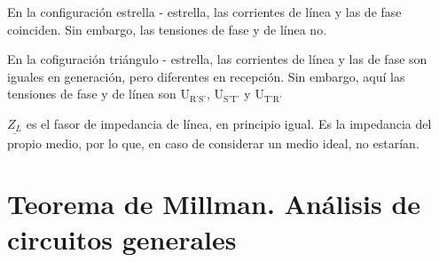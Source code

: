 \documentclass{article}
\begin{document}
\begin{flushleft}
En la configuración estrella - estrella, las corrientes de línea y las de fase coinciden. Sin embargo, las tensiones de fase y de línea no. \newline

En la cofiguración triángulo - estrella, las corrientes de línea y las de fase son iguales en generación, pero diferentes en recepción. Sin embargo, aquí las tensiones de fase y de línea son $\text{U}_{\text{R'S'}}$, $\text{U}_{\text{S'T'}}$ y $\text{U}_{\text{T'R'}}$ \newline

$\underline{Z_{L}}$ es el fasor de impedancia de línea, en principio igual. Es la impedancia del propio medio, por lo que, en caso de considerar un medio ideal, no estarían.
\end{flushleft}

\part{Teorema de Millman. Análisis de circuitos generales}
\end{document}
